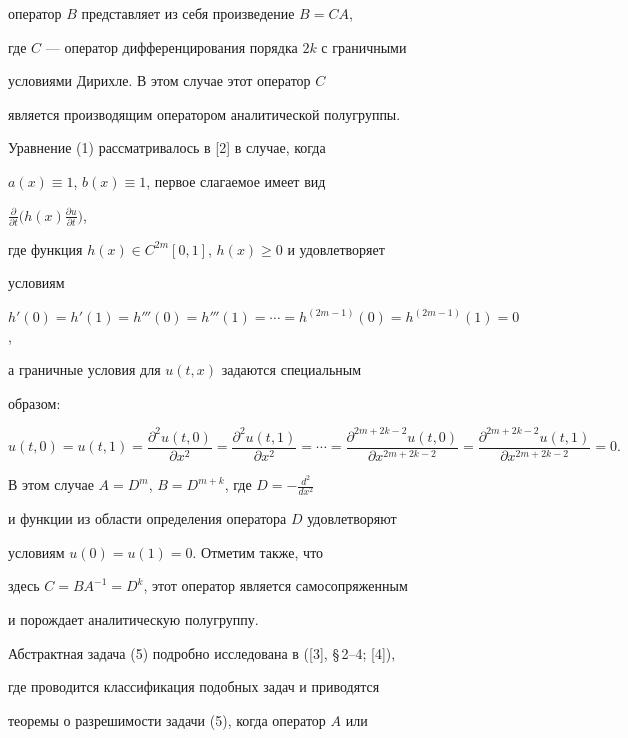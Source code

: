 оператор $B$ представляет из себя произведение $B=C A$, 


где $C$ --- оператор дифференцирования порядка $2k$ с граничными  


условиями Дирихле. В этом случае этот оператор $C$ 


является производящим оператором аналитической полугруппы.  


 


Уравнение (1) рассматривалось в [2] в случае, когда 


$a(x)\equiv1$, $b(x)\equiv1$, первое слагаемое имеет вид 


$\frac{\partial}{\partial t}\big(h(x)\frac{\partial u}{\partial t}\big)$, 


где функция $h(x)\in C^{2m}[0,1]$, $h(x)\ge0$ и удовлетворяет 


условиям 


$h'(0)=h'(1)=h'''(0)=h'''(1)=\dotsb=h^{(2m-1)}(0)=h^{(2m-1)}(1)=0$, 


а граничные условия для $u(t,x)$ задаются специальным 


образом: 


\begin{equation} 


u(t,0)=u(t,1)=\frac{\partial^2u(t,0)}{\partial x^2}= 


\frac{\partial^2u(t,1)}{\partial x^2}=\dotsb= 


\frac{\partial^{2m+2k-2}u(t,0)}{\partial x^{2m+2k-2}}= 


\frac{\partial^{2m+2k-2}u(t,1)}{\partial x^{2m+2k-2}}=0.\tag{5$^*$} 


\end{equation} 


В этом случае $A=D^m$, $B=D^{m+k}$, где $D=-\frac{d^2}{d x^2}$ 


и функции из области определения оператора $D$ удовлетворяют  


условиям $u(0)=u(1)=0$. Отметим также, что 


здесь $C=B A^{-1}=D^k$, этот оператор является самосопряженным  


и порождает аналитическую полугруппу. 


 


Абстрактная задача (5) подробно исследована в ([3], \S\,2--4; [4]), 


где проводится классификация подобных задач и приводятся  


теоремы о разрешимости задачи (5), когда оператор $A$ или 


